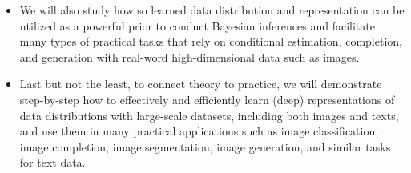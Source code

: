 \documentclass[../../book-main.tex]{subfiles}
\begin{document}
\begin{itemize}
\item We will also study how so learned data distribution and representation can be utilized as a powerful prior to conduct Bayesian inferences and facilitate many types of practical tasks that rely on conditional estimation, completion, and generation with real-word high-dimensional data such as images. 

\item Last but not the least, to connect theory to practice, we will demonstrate step-by-step how to effectively and efficiently learn (deep) representations of  data distributions with large-scale datasets, including both images and texts, and use them in many practical applications such as image classification, image completion, image segmentation, image generation, and similar tasks for text data. 
\end{itemize}
\end{document}
